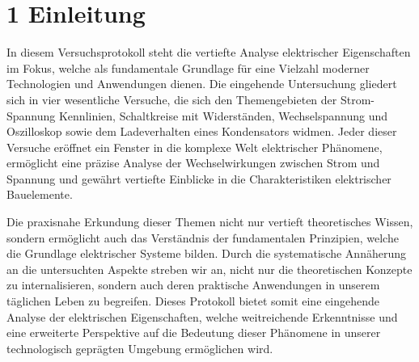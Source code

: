 \chapter*{1 Einleitung}
\setcounter{chapter}{1}
\setcounter{section}{0}
\setcounter{subsection}{0}

In diesem Versuchsprotokoll steht die vertiefte Analyse elektrischer Eigenschaften im Fokus, welche als fundamentale Grundlage für eine Vielzahl moderner Technologien und Anwendungen dienen. Die eingehende Untersuchung gliedert sich in vier wesentliche Versuche, die sich den Themengebieten der Strom-Spannung Kennlinien, Schaltkreise mit Widerständen, Wechselspannung und Oszilloskop sowie dem Ladeverhalten eines Kondensators widmen. Jeder dieser Versuche eröffnet ein Fenster in die komplexe Welt elektrischer Phänomene, ermöglicht eine präzise Analyse der Wechselwirkungen zwischen Strom und Spannung und gewährt vertiefte Einblicke in die Charakteristiken elektrischer Bauelemente.

Die praxisnahe Erkundung dieser Themen nicht nur vertieft theoretisches Wissen, sondern ermöglicht auch das Verständnis der fundamentalen Prinzipien, welche die Grundlage elektrischer Systeme bilden. Durch die systematische Annäherung an die untersuchten Aspekte streben wir an, nicht nur die theoretischen Konzepte zu internalisieren, sondern auch deren praktische Anwendungen in unserem täglichen Leben zu begreifen. Dieses Protokoll bietet somit eine eingehende Analyse der elektrischen Eigenschaften, welche weitreichende Erkenntnisse und eine erweiterte Perspektive auf die Bedeutung dieser Phänomene in unserer technologisch geprägten Umgebung ermöglichen wird.